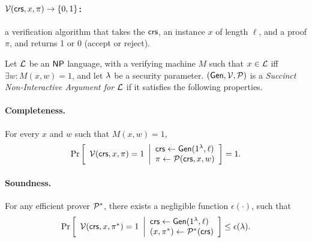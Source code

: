 \paragraph{$\mathcal{V}(\mathsf{crs}, x, \pi)\to \left \{{0,1} \right \}$:} a verification algorithm that takes the $\mathsf{crs}$, an instance $x$ of length $\ell$,
		and a proof $\pi$, and returns 1 or 0 (accept or reject).
\begin{definition} \label{def:snarg}
Let $\mathcal{L}$ be an ${\mathsf{NP}}$ language, with a verifying machine $M$
such that $x \in \mathcal{L}$ iff $\exists w: M(x,w)=1$, and let $\lambda$ be a security parameter. $(\mathsf{Gen}, \mathcal{V}, \mathcal{P})$ is a \emph{Succinct Non-Interactive Argument for $\mathcal{L}$}
if it satisfies the following properties.
\vspace{-1ex}
\paragraph{Completeness.} For every $x$ and $w$ such that $M(x,w)=1$,
    \begin{gather*}
        \underset{}{\text{Pr}}\left [ 
        \begin{array}{ll}
        \mathcal{V}(\mathsf{crs}, x, \pi) = 1
        \end{array}
        \middle\vert
        \begin{array}{ll}
        \mathit{ \mathsf{crs} } \leftarrow \mathsf{Gen}(1^\lambda, \ell) \\
        \pi \leftarrow \mathcal{P}(\mathit{ \mathsf{crs} }, x, w) \\
        \end{array}
        \right ] = 1
	.
    \end{gather*}
\vspace{-1ex}
\paragraph{Soundness.} For any efficient prover $\mathcal{P}^*$, there exists a negligible function $\epsilon(\cdot)$, such that \begin{gather*}
        \underset{}{\text{Pr}}\left [
        \begin{array}{ll}
        \mathcal{V}(\mathit{ \mathsf{crs} }, x, \pi^*) = 1
        \end{array}
        \middle\vert
        \begin{array}{ll}
        \mathit{ \mathsf{crs} } \leftarrow \mathsf{Gen}(1^\lambda, \ell) \\
        (x, \pi^*) \leftarrow \mathcal{P}^*(\mathit{ \mathsf{crs} }) \\
        \end{array}
        \right ] \leq \epsilon(\lambda)
	.
    \end{gather*}
\vspace{-1ex}

\end{definition}
